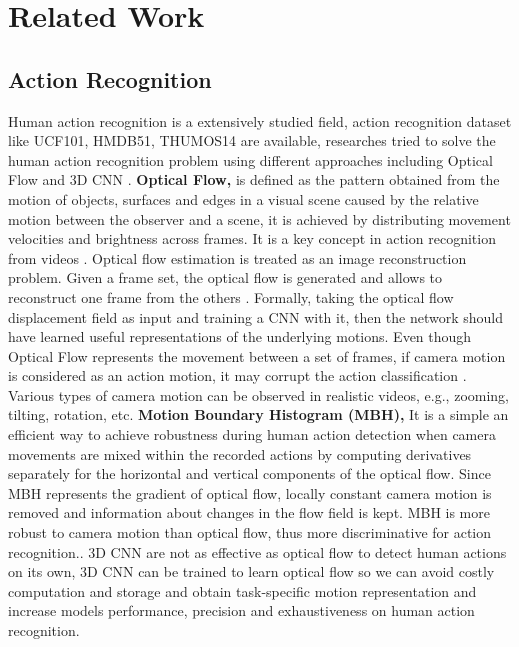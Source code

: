 \documentclass[twocolumn,conference]{article}
\begin{document}
\section{Related Work} \label{relatedwork}
\subsection{Action Recognition}
Human action recognition is a extensively studied field, action recognition dataset like UCF101, HMDB51, THUMOS14  are available, researches tried to solve the human action recognition problem using different approaches including Optical Flow and 3D CNN \cite{qiu2017learning}.  \textbf{Optical Flow,} is defined as the pattern obtained from the motion of objects, surfaces and edges in a visual scene caused by the relative motion between the observer and a scene, it is achieved by distributing movement velocities and brightness across frames. It is a  key concept in action recognition from videos \cite{wang2019hallucinating}. Optical flow estimation is treated as an image reconstruction problem. Given a frame set, the optical flow is generated and allows to reconstruct one frame from the others \cite{zhu2018hidden}. Formally, taking the optical flow displacement field as input and training a CNN with it, then the network should have learned useful representations of the underlying motions. Even though Optical Flow represents the movement between a set of frames, if camera motion is considered as an action motion, it may corrupt the action classification \cite{wang2013dense}. Various types of camera motion can be observed in realistic videos, e.g., zooming, tilting, rotation, etc. \textbf{Motion Boundary Histogram (MBH),} It is a simple an efficient way to achieve robustness during human action detection when camera movements are mixed within the recorded actions by computing derivatives separately for the horizontal and vertical components of the optical flow. Since MBH represents the gradient of optical flow, locally constant camera motion is removed and information about changes in the flow field is kept. MBH is more robust to camera motion than optical flow, thus more discriminative for action recognition.\cite{wang2013dense}. 3D CNN are not as effective as optical flow to detect human actions on its own, 3D CNN can be trained to learn optical flow so we can avoid costly computation and storage and obtain task-specific motion representation  \cite{zhu2018hidden} and increase models performance, precision and exhaustiveness on human action recognition.
\end{document}

